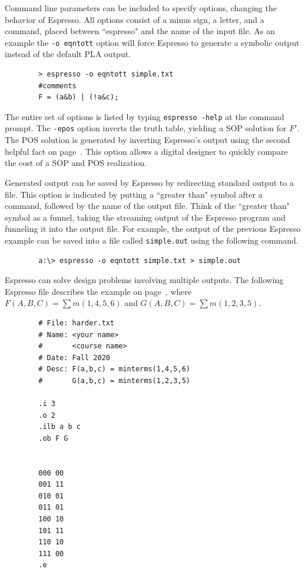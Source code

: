 \begin{process:minimizationKmap}
Command line parameters can be included to specify options, 
 changing the behavior of Espresso.
All options consist of a minus sign, a letter, and a command, 
placed between ``espresso" and the name of the input file. As an 
example the \verb+-o eqntott+ option will force Espresso to generate a
symbolic output instead of the default PLA output.

\begin{verbatim}
        > espresso -o eqntott simple.txt
        #comments
        F = (a&b) | (!a&c);
\end{verbatim}

The entire set of options is listed by typing 
\verb+espresso -help+ at the command prompt. The \verb+-epos+ option
inverts the truth table, yielding a SOP solution for
$F'$.  The POS solution is generated by inverting Espresso's
output using the second helpful fact on page~\pageref{page:second}.
This option allows a digital designer to quickly compare the
cost of a SOP and POS realization.

Generated output can be saved by Espresso by redirecting standard
output to a file.  This option is indicated by putting a ``greater than" symbol after a
command, followed by the name of the output file.
Think of the ``greater than" symbol as a funnel, taking 
the streaming output of the Espresso program and funneling it into
the output file.  For example, the output of the previous Espresso example can
be saved into a file called \verb+simple.out+ using the following command.

\begin{verbatim}
        a:\> espresso -o eqntott simple.txt > simple.out
\end{verbatim}

Espresso can solve design problems involving multiple outputs. The
following Espresso file describes the example on 
page~\pageref{page:DualFnc}, where 
$F(A,B,C) = \sum m(1,4,5,6)$ and $G(A,B,C) = \sum m(1,2,3,5)$.  

\begin{verbatim}
        # File: harder.txt
        # Name: <your name>
        #       <course name>
        # Date: Fall 2020
        # Desc: F(a,b,c) = minterms(1,4,5,6)
        #       G(a,b,c) = minterms(1,2,3,5)
        
        .i 3
        .o 2
        .ilb a b c
        .ob F G
        
        
        000 00
        001 11
        010 01
        011 01
        100 10
        101 11
        110 10
        111 00
        .e
\end{verbatim}


\end{process:minimizationKmap}
